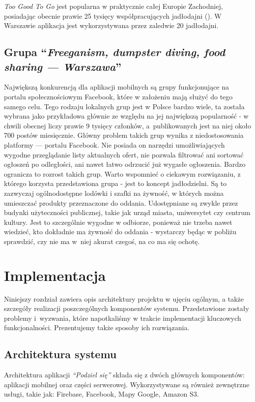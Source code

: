\documentclass[licencjacka]{pracamgr}
\begin{document}
\textit{Too Good To Go} jest popularna w praktycznie całej Europie Zachodniej, posiadając obecnie prawie 25 tysięcy współpracujących jadłodajni (\cite{tgtg}). W Warszawie aplikacja jest wykorzystywana przez zaledwie 20 jadłodajni.

\section{Grupa ``\textit{Freeganism, dumpster diving, food sharing --- Warszawa}''}
Największą konkurencją dla aplikacji mobilnych są grupy funkcjonujące na portalu społecznościowym Facebook, które w założeniu mają służyć do tego samego celu. Tego rodzaju lokalnych grup jest w Polsce bardzo wiele, ta została wybrana jako przykładowa głównie ze względu na jej największą popularność - w chwili obecnej liczy prawie 9 tysięcy członków, a~publikowanych jest na niej około 700 postów miesięcznie. Główny problem takich grup wynika z niedostosowania platformy --- portalu Facebook. Nie posiada on narzędzi umożliwiających wygodne przeglądanie listy aktualnych ofert, nie pozwala filtrować ani sortować ogłoszeń po odległości, ani nawet łatwo odrzucić już wygasłe ogłoszenia. Bardzo ogranicza to rozrost takich grup. Warto wspomnieć o ciekawym rozwiązaniu, z którego korzysta przedstawiona grupa - jest to koncept jadłodzielni. Są to zazwyczaj ogólnodostępne lodówki i szafki na żywność, w których można umieszczać produkty przeznaczone do oddania. Udostępniane są zwykle przez budynki użyteczności publicznej, takie jak urząd miasta, uniwersytet czy centrum kultury. Jest to szczególnie wygodne w odbiorze, ponieważ nie trzeba nawet wiedzieć, kto dokładnie ma żywność do oddania - wystarczy będąc w pobliżu sprawdzić, czy nie ma w~niej akurat czegoś, na co ma się ochotę.

\chapter{Implementacja}\label{r:arch}

Niniejszy rozdział zawiera opis architektury projektu w ujęciu ogólnym, a także szczegóły realizacji poszczególnych komponentów systemu. Przedstawione zostały problemy i~wyzwania, które napotkaliśmy w trakcie implementacji kluczowych funkcjonalności. Prezentujemy także sposoby ich rozwiązania.

\section{Architektura systemu}
Architektura aplikacji \textit{``Podziel się''} składa się z dwóch głównych komponentów: aplikacji mobilnej oraz części serwerowej. Wykorzystywane są również zewnętrzne usługi, takie jak: Firebase, Facebook, Mapy Google, Amazon S3.
\end{document}
